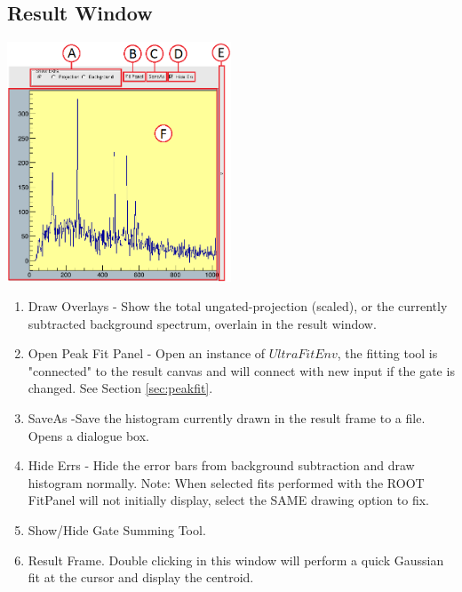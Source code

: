 \documentclass[a4paper,10pt]{article}
\begin{document}
\subsection{Result Window}
\begin{center}
\includegraphics[width=0.5\textwidth]{jGateE.png}
\end{center}
\begin{enumerate}
\item Draw Overlays - Show the total ungated-projection (scaled), or the currently subtracted background spectrum, overlain in the result window.
\item Open Peak Fit Panel - Open an instance of $UltraFitEnv$, the fitting tool is "connected" to the result canvas and will connect with new input if the gate is changed. See Section \ref{sec:peakfit}.
\item SaveAs -Save the histogram currently drawn in the result frame to a file. Opens a dialogue box.
\item Hide Errs - Hide the error bars from background subtraction and draw histogram normally. Note: When selected fits performed with the ROOT FitPanel will not initially display, select the SAME drawing option to fix.
\item Show/Hide Gate Summing Tool.
\item Result Frame. Double clicking in this window will perform a quick Gaussian fit at the cursor and display the centroid.
\end{enumerate}
\end{document}
